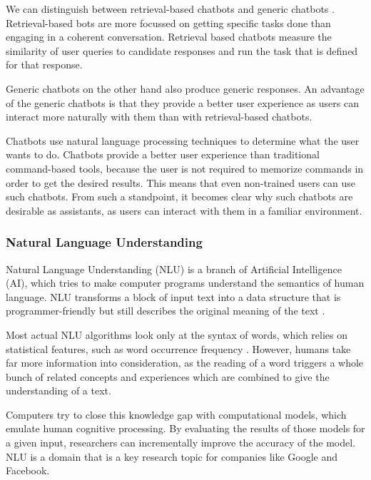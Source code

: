 
We can distinguish between retrieval-based chatbots and generic chatbots \cite{NLKl19,WWX*16}.
Retrieval-based bots are more focussed on getting specific tasks done than engaging in a coherent conversation.
Retrieval based chatbots measure the similarity of user queries to candidate responses and run the task that is defined for that response.


Generic chatbots on the other hand also produce generic responses.
An advantage of the generic chatbots is that they provide a better user experience as users can interact more naturally with them than with retrieval-based chatbots.

Chatbots use natural language processing techniques to determine what the user wants to do.
Chatbots provide a better user experience \cite{CHW*17} than traditional command-based tools, because the user is not required to memorize commands in order to get the desired results.
This means that even non-trained users can use such chatbots.
From such a standpoint, it becomes clear why such chatbots are desirable as assistants, as users can interact with them in a familiar environment.

\subsubsection{Natural Language Understanding}\label{sec:NLU}
Natural Language Understanding (NLU) is a branch of Artificial Intelligence (AI), which tries to make computer programs understand the semantics of human language.
NLU transforms a block of input text into a data structure that is programmer-friendly but still describes the original meaning of the text \cite{CWB*11}.

Most actual NLU algorithms look only at the syntax of words, which relies on statistical features, such as word occurrence frequency \cite{CaWh14}.
However, humans take far more information into consideration, as the reading of a word triggers a whole bunch of related concepts and experiences which are combined to give the understanding of a text.

Computers try to close this knowledge gap with computational models, which emulate human cognitive processing.
By evaluating the results of those models for a given input, researchers can incrementally improve the accuracy of the model. \cite{CaWh14}
NLU is a domain that is a key research topic for companies like Google and Facebook. \cite{AAA17}


